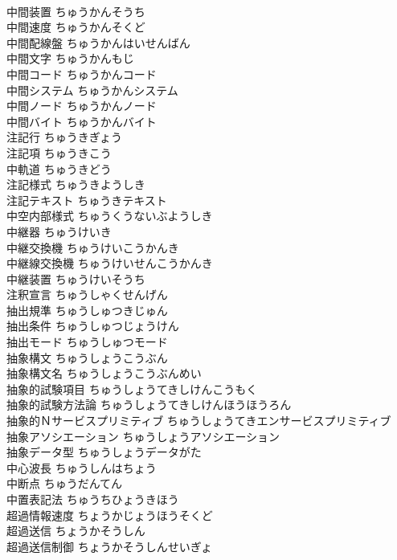 \documentclass[8pt]{extreport}
\begin{document}
\begin{CJK}{UTF8}{min}
\\	中間装置	ちゅうかんそうち	
\\	中間速度	ちゅうかんそくど	
\\	中間配線盤	ちゅうかんはいせんばん	
\\	中間文字	ちゅうかんもじ	
\\	中間コード	ちゅうかんコード	
\\	中間システム	ちゅうかんシステム	
\\	中間ノード	ちゅうかんノード	
\\	中間バイト	ちゅうかんバイト	
\\	注記行	ちゅうきぎょう	
\\	注記項	ちゅうきこう	
\\	中軌道	ちゅうきどう	
\\	注記様式	ちゅうきようしき	
\\	注記テキスト	ちゅうきテキスト	
\\	中空内部様式	ちゅうくうないぶようしき	
\\	中継器	ちゅうけいき	
\\	中継交換機	ちゅうけいこうかんき	
\\	中継線交換機	ちゅうけいせんこうかんき	
\\	中継装置	ちゅうけいそうち	
\\	注釈宣言	ちゅうしゃくせんげん	
\\	抽出規準	ちゅうしゅつきじゅん	
\\	抽出条件	ちゅうしゅつじょうけん	
\\	抽出モード	ちゅうしゅつモード	
\\	抽象構文	ちゅうしょうこうぶん	
\\	抽象構文名	ちゅうしょうこうぶんめい	
\\	抽象的試験項目	ちゅうしょうてきしけんこうもく	
\\	抽象的試験方法論	ちゅうしょうてきしけんほうほうろん	
\\	抽象的Ｎサービスプリミティブ	ちゅうしょうてきエンサービスプリミティブ	
\\	抽象アソシエーション	ちゅうしょうアソシエーション	
\\	抽象データ型	ちゅうしょうデータがた	
\\	中心波長	ちゅうしんはちょう	
\\	中断点	ちゅうだんてん	
\\	中置表記法	ちゅうちひょうきほう	
\\	超過情報速度	ちょうかじょうほうそくど	
\\	超過送信	ちょうかそうしん	
\\	超過送信制御	ちょうかそうしんせいぎょ	

\end{CJK}
\end{document}
